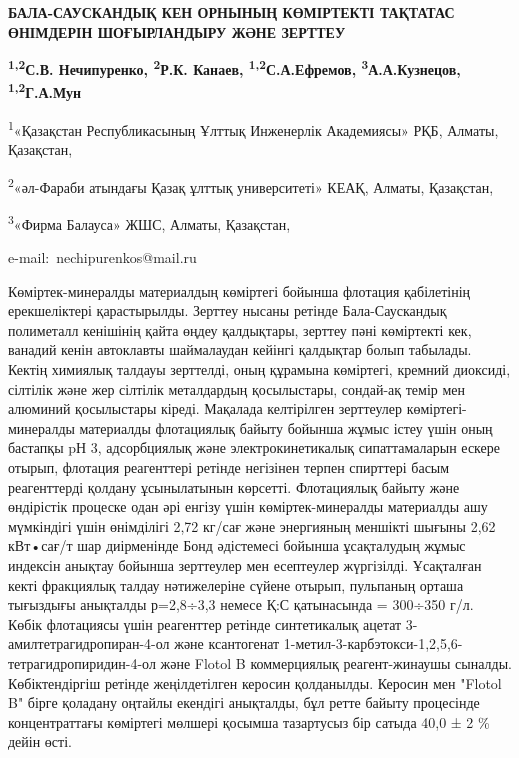 \begin{center}
{\large\bfseries БАЛА-САУСКАНДЫҚ КЕН ОРНЫНЫҢ КӨМІРТЕКТІ ТАҚТАТАС ӨНІМДЕРІН
ШОҒЫРЛАНДЫРУ ЖӘНЕ ЗЕРТТЕУ}

{\bfseries \textsuperscript{1,2}С.В. Нечипуренко, \textsuperscript{2}Р.К.
Канаев, \textsuperscript{1,2}С.А.Ефремов,
\textsuperscript{3}А.А.Кузнецов, \textsuperscript{1,2}Г.А.Мун}

\textsuperscript{1}«Қазақстан Республикасының Ұлттық Инженерлік
Академиясы» РҚБ, Алматы, Қазақстан,

\textsuperscript{2}«әл-Фараби атындағы Қазақ ұлттық университеті» КЕАҚ,
Алматы, Қазақстан,

\textsuperscript{3}«Фирма Балауса» ЖШС, Алматы, Қазақстан,

e-mail:~nechipurenkos@mail.ru
\end{center}

Көміртек-минералды материалдың көміртегі бойынша флотация қабілетінің
ерекшеліктері қарастырылды. Зерттеу нысаны ретінде Бала-Саускандық
полиметалл кенішінің қайта өңдеу қалдықтары, зерттеу пәні көміртекті
кек, ванадий кенін автоклавты шаймалаудан кейінгі қалдықтар болып
табылады. Кектің химиялық талдауы зерттелді, оның құрамына көміртегі,
кремний диоксиді, сілтілік және жер сілтілік металдардың қосылыстары,
сондай-ақ темір мен алюминий қосылыстары кіреді. Мақалада келтірілген
зерттеулер көміртегі-минералды материалды флотациялық байыту бойынша
жұмыс істеу үшін оның бастапқы pН 3, адсорбциялық және
электрокинетикалық сипаттамаларын ескере отырып, флотация реагенттері
ретінде негізінен терпен спирттері басым реагенттерді қолдану
ұсынылатынын көрсетті. Флотациялық байыту және өндірістік процеске одан
әрі енгізу үшін көміртек-минералды материалды ашу мүмкіндігі үшін
өнімділігі 2,72 кг/сағ және энергияның меншікті шығыны 2,62 кВт•сағ/т
шар диірменінде Бонд әдістемесі бойынша ұсақталудың жұмыс индексін
анықтау бойынша зерттеулер мен есептеулер жүргізілді. Ұсақталған кекті
фракциялық талдау нәтижелеріне сүйене отырып, пульпаның орташа тығыздығы
анықталды р=2,8÷3,3 немесе Қ:С қатынасында = 300÷350 г/л. Көбік
флотациясы үшін реагенттер ретінде синтетикалық ацетат
3-амилтетрагидропиран-4-ол және ксантогенат
1-метил-3-карбэтокси-1,2,5,6-тетрагидропиридин-4-ол және Flotol B
коммерциялық реагент-жинаушы сыналды. Көбіктендіргіш ретінде
жеңілдетілген керосин қолданылды. Керосин мен "Flotol B" бірге қоладану
оңтайлы екендігі анықталды, бұл ретте байыту процесінде концентраттағы
көміртегі мөлшері қосымша тазартусыз бір сатыда 40,0 ± 2 \% дейін өсті.

